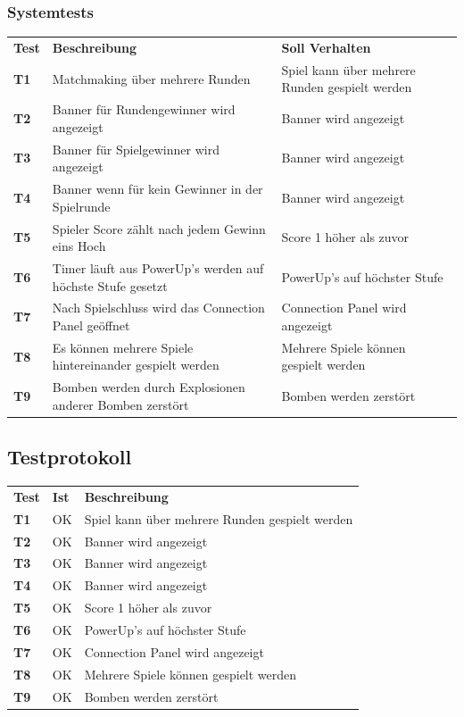 \documentclass[11pt]{scrartcl}
\begin{document}
\subsubsection{Systemtests}
\begin{tabularx}{\linewidth}{l X X}
  \bf{Test} & \bf{Beschreibung} & \bf{Soll Verhalten} \\
 \bf{T1} & Matchmaking über mehrere Runden & Spiel kann über mehrere 
 Runden gespielt werden \\
 \bf{T2} & Banner für Rundengewinner wird angezeigt & Banner wird angezeigt \\
 \bf{T3} & Banner für Spielgewinner wird angezeigt & Banner wird angezeigt \\
 \bf{T4} & Banner wenn für kein Gewinner in der Spielrunde & Banner wird 
 angezeigt\\
 \bf{T5} & Spieler Score zählt nach jedem Gewinn eins Hoch & Score 1 höher als 
 zuvor \\
 \bf{T6} & Timer läuft aus PowerUp's werden auf höchste Stufe gesetzt & 
 PowerUp's auf höchster Stufe \\
 \bf{T7} & Nach Spielschluss wird das Connection Panel geöffnet & Connection 
 Panel wird angezeigt\\
 \bf{T8} & Es können mehrere Spiele hintereinander gespielt werden &
 Mehrere Spiele können gespielt werden \\
 \bf{T9} & Bomben werden durch Explosionen anderer Bomben zerstört &
 Bomben werden zerstört \\
 
 \end{tabularx}

\subsection{Testprotokoll}
\begin{tabularx}{\linewidth}{l l X}
  \bf{Test} & \bf{Ist} & \bf{Beschreibung} \\
  \bf{T1} & OK & Spiel kann über mehrere Runden gespielt werden\\
  \bf{T2} & OK &  Banner wird angezeigt \\
  \bf{T3} & OK  & Banner wird angezeigt \\
  \bf{T4} & OK &  Banner wird angezeigt \\
  \bf{T5} & OK & Score 1 höher als zuvor\\
  \bf{T6} & OK &   PowerUp's auf höchster Stufe \\
  \bf{T7} & OK & Connection Panel wird angezeigt\\
  \bf{T8} & OK & Mehrere Spiele können gespielt werden\\
  \bf{T9} & OK & Bomben werden zerstört\\
\end{tabularx}
\end{document}

